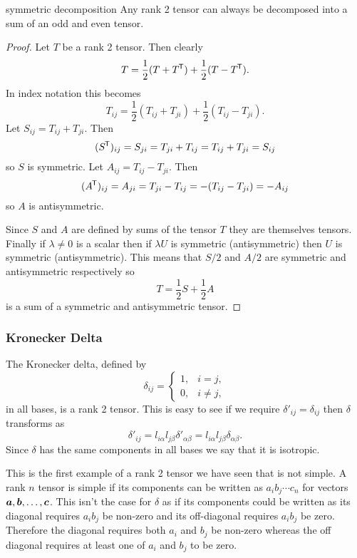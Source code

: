 \documentclass[a4paper]{article}
\begin{document}
    \begin{lemma}{symmetric decomposition}{}
        Any rank 2 tensor can always be decomposed into a sum of an odd and even tensor.
    \end{lemma}
    \begin{proof}
        Let \(T\) be a rank 2 tensor.
        Then clearly
        \[T = \frac{1}{2}(T + T^{\mkern-1.5mu\mathsf{T}}) + \frac{1}{2}(T - T^{\mkern-1.5mu\mathsf{T}}).\]
        In index notation this becomes
        \[T_{ij} = \frac{1}{2}(T_{ij} + T_{ji}) + \frac{1}{2}(T_{ij} - T_{ji}).\]
        Let \(S_{ij} = T_{ij} + T_{ji}\).
        Then
        \[(S^{\mkern-1.5mu\mathsf{T}})_{ij} = S_{ji} = T_{ji} + T_{ij} = T_{ij} + T_{ji} = S_{ij}\]
        so \(S\) is symmetric.
        Let \(A_{ij} = T_{ij} - T_{ji}\).
        Then
        \[(A^{\mkern-1.5mu\mathsf{T}})_{ij} = A_{ji} = T_{ji} - T_{ij} = -(T_{ij} - T_{ji}) = -A_{ij}\]
        so \(A\) is antisymmetric.
        
        Since \(S\) and \(A\) are defined by sums of the tensor \(T\) they are themselves tensors.
        Finally if \(\lambda\ne 0\) is a scalar then if \(\lambda U\) is  symmetric (antisymmetric) then \(U\) is symmetric (antisymmetric).
        This means that \(S/2\) and \(A/2\) are symmetric and antisymmetric respectively so
        \[T = \frac{1}{2}S + \frac{1}{2}A\]
        is a sum of a symmetric and antisymmetric tensor.
    \end{proof}

    \subsubsection{Kronecker Delta}
    The Kronecker delta, defined by
    \[
        \delta_{ij} =
        \begin{cases}
            1, & i = j,\\
            0, & i \ne j,
        \end{cases}
    \]
    in all bases, is a rank 2 tensor.
    This is easy to see if we require \(\delta'_{ij} = \delta_{ij}\) then \(\delta\) transforms as
    \[\delta'_{ij} = l_{i\alpha}l_{j\beta}\delta'_{\alpha\beta} = l_{i\alpha}l_{j\beta}\delta_{\alpha\beta}.\]
    Since \(\delta\) has the same components in all bases we say that it is isotropic.
    
    This is the first example of a rank 2 tensor we have seen that is not simple.
    A rank \(n\) tensor is simple if its components can be written as \(a_ib_j\dotsm c_n\) for vectors \(\bm{a}, \bm{b}, \dotsc, \bm{c}\).
    This isn't the case for \(\delta\) as if its components could be written as \(\)its diagonal requires \(a_ib_j\) be non-zero and its off-diagonal requires \(a_ib_j\) be zero.
    Therefore the diagonal requires both \(a_i\) and \(b_j\) be non-zero whereas the off diagonal requires at least one of \(a_i\) and \(b_j\) to be zero.
    
\end{document}
